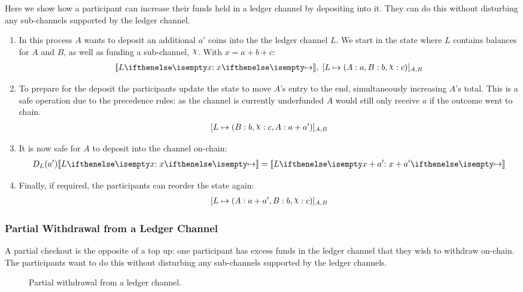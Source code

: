 Here we show how a participant can increase their funds held in a ledger channel by depositing into it.
They can do this without disturbing any sub-channels supported by the ledger channel.
\begin{enumerate}
  \item In this process $A$ wants to deposit an additional $a'$ coins into the the ledger channel $L$. We start in the state where $L$ contains balances for $A$ and $B$, as well as funding a sub-channel, $\rchi$. With $x = a + b + c$:
  \begin{align}
    \adj{\holds{L}{x}{}}, \; \finalizable{L}{\alloc{A: a, B: b, \rchi: c}}{A, B}
  \end{align}
  \item To prepare for the deposit the participants update the state to move $A$'s entry to the end, simultaneously increasing $A$'s total. This is a safe operation due to the precedence rules: as the channel is currently underfunded $A$ would still only receive $a$ if the outcome went to chain.
  \begin{align}
    \finalizable{L}{\alloc{B:b, \rchi: c, A: a + a'}}{A,B}
  \end{align}
  \item It is now safe for $A$ to deposit into the channel on-chain:
  \begin{align}
    D_L(a')\adj{\holds{L}{x}{}} = \adj{\holds{L}{x + a'}{}}
  \end{align}
  \item Finally, if required, the participants can reorder the state again:
  \begin{align}
    \finalizable{L}{\alloc{ A: a + a', B: b, \rchi: c}}{A,B}
  \end{align}
\end{enumerate}

\subsubsection{Partial Withdrawal from a Ledger Channel}

A partial checkout is the opposite of a top up: 
one participant has excess funds in the ledger channel that they wish to withdraw on-chain.
The participants want to do this without disturbing any sub-channels supported by the ledger channels.

\begin{figure}[h]\centering
  \makebox[\textwidth][c]{}
  \caption{Partial withdrawal from a ledger channel.}
\end{figure}

